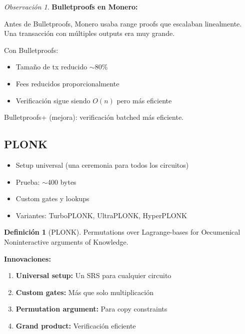 \documentclass[11pt,a4paper,twoside,openright]{book}
\theoremstyle{definition}
\newtheorem{definition}{Definición}[chapter]
\theoremstyle{plain}
\theoremstyle{remark}
\newtheorem{remark}{Observación}[chapter]
\begin{document}
\begin{remark}
\textbf{Bulletproofs en Monero:}

Antes de Bulletproofs, Monero usaba range proofs que escalaban linealmente. Una transacción con múltiples outputs era muy grande.

Con Bulletproofs:
\begin{itemize}
    \item Tamaño de tx reducido $\sim$80\%
    \item Fees reducidos proporcionalmente
    \item Verificación sigue siendo $O(n)$ pero más eficiente
\end{itemize}

Bulletproofs+ (mejora): verificación batched más eficiente.
\end{remark}

\subsection{PLONK}

\begin{itemize}
    \item Setup universal (una ceremonia para todos los circuitos)
    \item Prueba: $\sim$400 bytes
    \item Custom gates y lookups
    \item Variantes: TurboPLONK, UltraPLONK, HyperPLONK
\end{itemize}

\begin{definition}[PLONK]
Permutations over Lagrange-bases for Oecumenical Noninteractive arguments of Knowledge.

\textbf{Innovaciones:}
\begin{enumerate}
    \item \textbf{Universal setup:} Un SRS para cualquier circuito
    \item \textbf{Custom gates:} Más que solo multiplicación
    \item \textbf{Permutation argument:} Para copy constraints
    \item \textbf{Grand product:} Verificación eficiente
\end{enumerate}
\end{definition}
\end{document}
